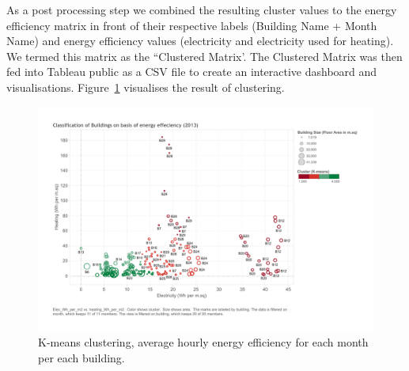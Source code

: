 As a post processing step we combined the resulting cluster values to the energy efficiency matrix in front of their respective labels (Building Name + Month Name) and energy efficiency values (electricity and electricity used for heating). We termed this matrix as the ``Clustered Matrix'. The Clustered Matrix was then fed into Tableau public as a CSV file to create an interactive dashboard and visualisations. Figure~\ref{fig:kmeans} visualises the result of clustering.  

\begin{figure}[!ht]
    \begin{center}
      \includegraphics[width=\textwidth]{images/kmeans.pdf}
      \caption{K-means clustering, average hourly energy efficiency for each month per each building.}
      \label{fig:kmeans}
    \end{center}
\end{figure} 

